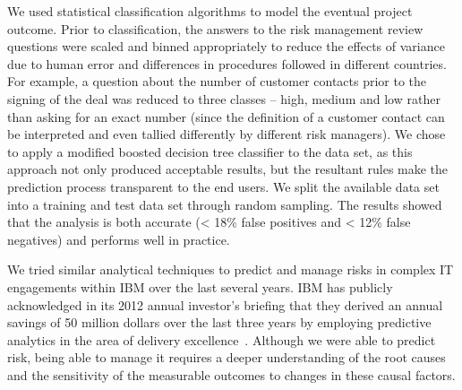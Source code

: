 We used statistical classification algorithms to model the eventual project outcome. Prior to classification, the answers to the risk management review questions were scaled and binned appropriately to reduce the effects of variance due to human error and differences in procedures followed in different countries. For example, a question about the number of customer contacts prior to the signing of the deal was reduced to three classes -- high, medium and low rather than asking for an exact number (since the definition of a customer contact can be interpreted and even tallied differently by different risk managers). We chose to apply a modified boosted decision tree classifier to the data set, as this approach not only produced acceptable results, but the resultant rules make the prediction process transparent to the end users. We split the available data set into a training and test data set through random sampling. The results showed that the analysis is both accurate (< 18\% false positives and < 12\% false negatives) and performs well in practice.

We tried similar analytical techniques to predict and manage risks in complex IT engagements within IBM over the last several years. IBM has publicly acknowledged in its 2012 annual investor's briefing that they derived an annual savings of 50 million dollars over the last three years by employing predictive analytics in the area of delivery excellence~\cite{ibm-investors-briefing}. Although we were able to predict risk, being able to manage it requires a deeper understanding of the root causes and the sensitivity of the measurable outcomes to changes in these causal factors.

\label{sec:risk}
